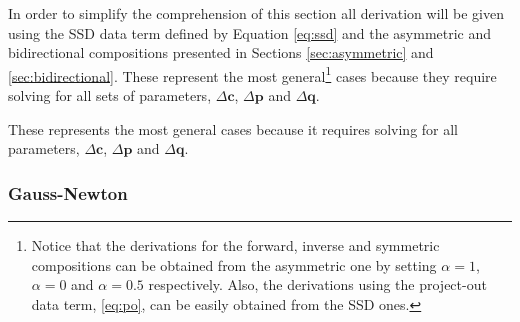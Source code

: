 In order to simplify the comprehension of this section all derivation will be given using the SSD data term defined by Equation \ref{eq:ssd} and the asymmetric and bidirectional compositions presented in Sections \ref{sec:asymmetric} and \ref{sec:bidirectional}. These represent the most general\footnote{Notice that the derivations for the forward, inverse and symmetric compositions can be obtained from the asymmetric one by setting $\alpha = 1$, $\alpha = 0$ and $\alpha = 0.5$ respectively. Also, the derivations using the project-out data term, \ref{eq:po}, can be easily obtained from the SSD ones.} cases because they require solving for all sets of parameters, $\Delta \mathbf{c}$, $\Delta \mathbf{p}$ and $\Delta \mathbf{q}$.

These represents the most general cases because it requires solving for all parameters, $\Delta \mathbf{c}$, $\Delta \mathbf{p}$ and $\Delta \mathbf{q}$.

\subsubsection{Gauss-Newton}
\label{sec:gauss_newton}

